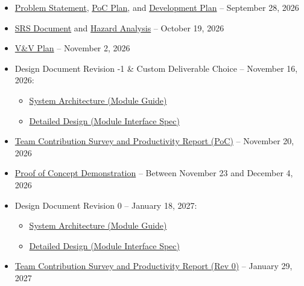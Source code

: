 \documentclass{article}
\begin{document}
\begin{itemize}
    \item \href{https://github.com/rhea333/LingoLyrics/tree/main/docs/ProblemStatementAndGoals}{Problem Statement}, \href{https://github.com/rhea333/LingoLyrics/tree/main/docs/DevelopmentPlan}{PoC Plan}, and \href{https://github.com/rhea333/LingoLyrics/tree/main/docs/DevelopmentPlan}{Development Plan} -- September 28, 2026
    \item \href{https://github.com/rhea333/LingoLyrics/tree/main/docs/SRS}{SRS Document} and \href{https://github.com/rhea333/LingoLyrics/tree/main/docs/HazardAnalysis}{Hazard Analysis} -- October 19, 2026
    \item \href{https://github.com/rhea333/LingoLyrics/tree/main/docs/VnVPlan}{V\&V Plan} -- November 2, 2026
    \item Design Document Revision -1 \& Custom Deliverable Choice -- November 16, 2026:
        \begin{itemize}
            \item \href{https://github.com/rhea333/LingoLyrics/tree/main/docs/Design/SoftArchitecture}{System Architecture (Module Guide)}
            \item \href{https://github.com/rhea333/LingoLyrics/tree/main/docs/Design/SoftDetailedDes}{Detailed Design (Module Interface Spec)}
        \end{itemize}
    \item \href{https://github.com/rhea333/LingoLyrics/tree/main/docs/projMngmnt}{Team Contribution Survey and Productivity Report (PoC)} -- November 20, 2026
    \item \href{https://github.com/rhea333/LingoLyrics/tree/main/docs/Presentations/PoCDemo}{Proof of Concept Demonstration} -- Between November 23 and December 4, 2026
    \item Design Document Revision 0 -- January 18, 2027:
        \begin{itemize}
            \item \href{https://github.com/rhea333/LingoLyrics/tree/main/docs/Design/SoftArchitecture}{System Architecture (Module Guide)}
            \item \href{https://github.com/rhea333/LingoLyrics/tree/main/docs/Design/SoftDetailedDes}{Detailed Design (Module Interface Spec)}
        \end{itemize}
    \item \href{https://github.com/rhea333/LingoLyrics/tree/main/docs/projMngmnt}{Team Contribution Survey and Productivity Report (Rev 0)} -- January 29, 2027

\end{itemize}
\end{document}
